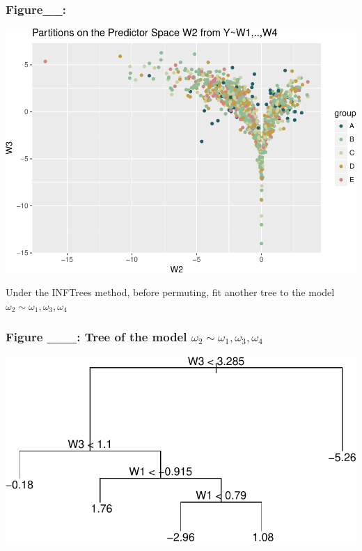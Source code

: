 \documentclass[12pt,twoside]{reedthesis}
\begin{document}
  \subsubsection{Figure\_\_:}\label{figure__}
  
  \begin{center}\includegraphics{Thesis_files/figure-latex/unnamed-chunk-6-1} \end{center}
  
  Under the INFTrees method, before permuting, fit another tree to the
  model \(\omega_2 \sim \omega_1, \omega_3, \omega_4\)
  
  \subsubsection{\texorpdfstring{Figure \_\_\_: Tree of the model
  \(\omega_2 \sim \omega_1, \omega_3, \omega_4\)}{Figure \_\_\_: Tree of the model \textbackslash{}omega\_2 \textbackslash{}sim \textbackslash{}omega\_1, \textbackslash{}omega\_3, \textbackslash{}omega\_4}}\label{figure-___-tree-of-the-model-omega_2-sim-omega_1-omega_3-omega_4}
  
  \begin{center}\includegraphics{Thesis_files/figure-latex/unnamed-chunk-7-1} \end{center}
  
\end{document}
